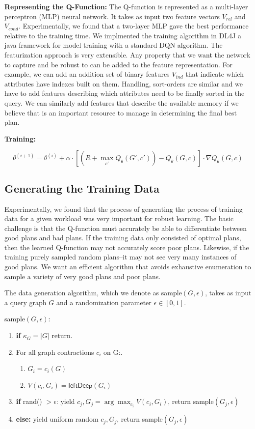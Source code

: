 \vspace{0.5em} \noindent \textbf{Representing the Q-Function: }
The Q-function is represented as a multi-layer perceptron (MLP) neural network.
It takes as input two feature vectors $V_{rel}$ and $V_{cond}$. Experimentally, we found that a two-layer MLP gave the best performance relative to the training time. We implmented the training algorithm in \textsf{DL4J} a java framework for model training with a standard DQN algorithm. The featurization approach is very extensible. Any property that we want the network to capture and be robust to can be added to the feature representation. For example, we can add an addition set of binary features $V_{ind}$ that indicate which attributes have indexes built on them. Handling, sort-orders are similar and we have to add features describing which attributes need to be finally sorted in the query. We can similarly add features that describe the available memory if we believe that is an important resource to manage in determining the final best plan.

\vspace{0.5em} \indent \textbf{Training: }

\[
\theta^{(i+1)} = \theta^{(i)} + \alpha \cdot [ (R + \max_{c'} Q_\theta(G',c')) - Q_\theta(G,c) ] \cdot \nabla Q_\theta(G,c) 
\]

\subsection{Generating the Training Data}
Experimentally, we found that the process of generating the process of training data for a given workload was very important for robust learning.
The basic challenge is that the Q-function must accurately be able to differentiate between good plans and bad plans.
If the training data only consisted of optimal plans, then the learned Q-function may not accurately score poor plans. Likewise, if the training purely sampled random plans--it may not see very many instances of good plans.
We want an efficient algorithm that avoids exhaustive enumeration to sample a variety of very good plans and poor plans.

The data generation algorithm, which we denote as \textsf{sample}$(G, \epsilon)$, takes as input a query graph $G$ and a randomization parameter $\epsilon \in [0,1]$.

\textsf{sample}$(G, \epsilon)$:
\begin{enumerate}
    \item \textbf{if} $\kappa_G = |G|$ return.
    \item For all graph contractions $c_i$ on G:.
    \begin{enumerate}
    \item $G_i = c_i(G)$  
    \item $V(c_i, G_i) = \textsf{leftDeep}(G_i)$
    \end{enumerate}
    \item \textbf{if} \textsf{rand()} $> \epsilon$: yield $c_j, G_j = \arg\max_{c_i} V(c_i,G_i)$, return \textsf{sample}$(G_j,\epsilon)$
    \item \textbf{else: } yield uniform random $c_j, G_j $, return \textsf{sample}$(G_j,\epsilon)$
\end{enumerate}

